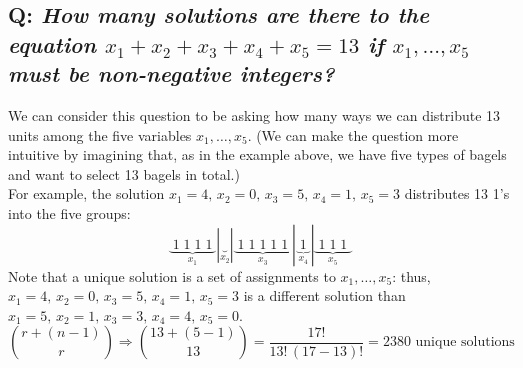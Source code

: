 \documentclass{article}
\begin{document}
%

\subsection*{Q: {\em How many solutions are there to the equation $x_1+x_2+x_3+x_4+x_5=13$ if $x_1,\ldots,x_5$ must be non-negative integers?}}
We can consider this question to be asking how many ways we can distribute 13 units among the five variables $x_1,\ldots,x_5$. (We can make the question more intuitive by imagining that, as in the example above, we have five types of bagels and want to select 13 bagels in total.)\\[1ex]
For example, the solution $x_1=4,\,x_2=0,\,x_3=5,\,x_4=1,\,x_5=3$ distributes 13 1's into the five groups:
\begin{equation*}
\underbrace{\;1\;1\;1\;1\;}_{x_1}|\underbrace{\;}_{x_2}|\underbrace{\;1\;1\;1\;1\;1\;}_{x_3}|\underbrace{\;1\;}_{x_4}|\underbrace{\;1\;1\;1\;}_{x_5}
\end{equation*}
Note that a unique solution is a set of assignments to $x_1,\ldots,x_5$: thus, $x_1=4,\,x_2=0,\,x_3=5,\,x_4=1,\,x_5=3$ is a different solution than $x_1=5,\,x_2=1,\,x_3=3,\,x_4=4,\,x_5=0$.
\begin{equation*}
\binom{r+(n-1)}{r}\Rightarrow\binom{13+(5-1)}{13}=\dfrac{17!}{13!\,(17-13)!}=2380\text{ unique solutions}
\end{equation*}
\end{document}
